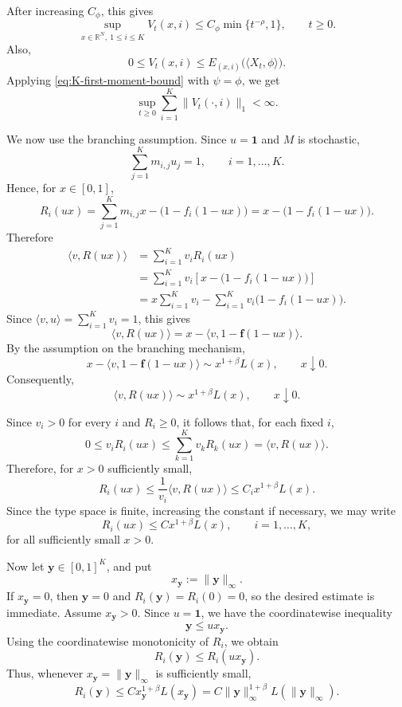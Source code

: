 \documentclass[reqno,final,11pt]{amsart}
\newcommand{\1}{\mathbbm{1}}
\theoremstyle{plain}
\theoremstyle{definition}
\theoremstyle{remark}
\begin{document}
After increasing \(C_\phi\), this gives
\begin{equation}\label{eq:K-V-sup-bound}
\sup_{x\in\mathbb R^N,\ 1\le i\le K}V_t(x,i)
\le
C_\phi\min\{t^{-\rho},1\},
\qquad t\ge0.
\end{equation}
Also,
\[
0\le V_t(x,i)
\le
E_{(x,i)}\big(\langle X_t,\phi\rangle\big).
\]
Applying \eqref{eq:K-first-moment-bound} with \(\psi=\phi\), we get
\begin{equation}\label{eq:K-L1-bound}
\sup_{t\ge0}\sum_{i=1}^K\|V_t(\cdot,i)\|_1<\infty.
\end{equation}

We now use the branching assumption. Since \(u=\mathbf 1\) and \(M\) is stochastic,
 \[
 \sum_{j=1}^K m_{i,j}u_j=1,
 \qquad i=1,\ldots,K.
 \]
 Hence, for \(x\in[0,1]\),
 \[
 R_i(ux)
 =
 \sum_{j=1}^K m_{i,j}x-
 \bigl(1-f_i(1-ux)\bigr)
 =
 x-\bigl(1-f_i(1-ux)\bigr).
 \]
Therefore
\[
\begin{aligned}
\langle v,R(ux)\rangle
&=
\sum_{i=1}^K v_iR_i(ux)  \\
&=
\sum_{i=1}^K v_i
\left[
x-\bigl(1-f_i(1-ux)\bigr)
\right]  \\
&=
x\sum_{i=1}^K v_i
-
\sum_{i=1}^K v_i\bigl(1-f_i(1-ux)\bigr).
\end{aligned}
\]
Since \(\langle v,u\rangle=\sum_{i=1}^K v_i=1\), this gives
\[
\langle v,R(ux)\rangle
=
x-\langle v,1-\mathbf f(1-ux)\rangle.
\]
By the assumption on the branching mechanism,
\[
x-\langle v,1-\mathbf f(1-ux)\rangle
\sim
x^{1+\beta}L(x),
\qquad x\downarrow0.
\]
Consequently,
\[
\langle v,R(ux)\rangle
\sim
x^{1+\beta}L(x),
\qquad x\downarrow0.
\]

Since \(v_i>0\) for every \(i\) and \(R_i\ge0\), it follows that, for each fixed
\(i\),
\[
0\le v_iR_i(ux)
\le
\sum_{k=1}^K v_kR_k(ux)
=
\langle v,R(ux)\rangle.
\]
Therefore, for \(x>0\) sufficiently small,
\[
R_i(ux)
\le
\frac{1}{v_i}\langle v,R(ux)\rangle
\le
C_i x^{1+\beta}L(x).
\]
Since the type space is finite, increasing the constant if necessary, we may write
\[
R_i(ux)\le C x^{1+\beta}L(x),
\qquad i=1,\dots,K,
\]
for all sufficiently small \(x>0\).

Now let \(\mathbf y\in[0,1]^K\), and put
\[
x_{\mathbf y}:=\|\mathbf y\|_\infty.
\]
If \(x_{\mathbf y}=0\), then \(\mathbf y=0\) and \(R_i(\mathbf y)=R_i(0)=0\), so the
desired estimate is immediate. Assume \(x_{\mathbf y}>0\). Since \(u=\mathbf 1\),
we have the coordinatewise inequality
\[
\mathbf y\le ux_{\mathbf y}.
\]
Using the coordinatewise monotonicity of \(R_i\), we obtain
\[
R_i(\mathbf y)
\le
R_i(ux_{\mathbf y}).
\]
Thus, whenever \(x_{\mathbf y}=\|\mathbf y\|_\infty\) is sufficiently small,
\[
R_i(\mathbf y)
\le
C x_{\mathbf y}^{1+\beta}L(x_{\mathbf y})
=
C\|\mathbf y\|_\infty^{1+\beta}
L(\|\mathbf y\|_\infty).
\]
\end{document}
